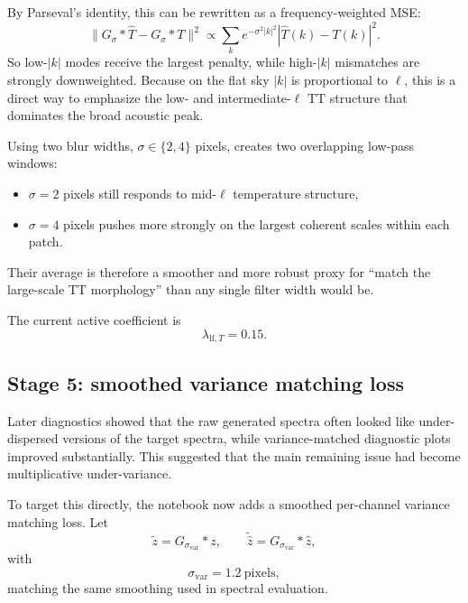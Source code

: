 \documentclass[11pt]{article}
\begin{document}
By Parseval's identity, this can be rewritten as a frequency-weighted MSE:
\begin{equation}
  \|G_\sigma * \hat T - G_\sigma * T\|^2
  \propto
  \sum_k
  e^{-\sigma^2 |k|^2}
  |\hat T(k)-T(k)|^2.
\end{equation}
So low-\(|k|\) modes receive the largest penalty, while high-\(|k|\) mismatches are strongly downweighted. Because on the flat sky \(|k|\) is proportional to \(\ell\), this is a direct way to emphasize the low- and intermediate-\(\ell\) TT structure that dominates the broad acoustic peak.

Using two blur widths, \(\sigma\in\{2,4\}\) pixels, creates two overlapping low-pass windows:
\begin{itemize}[leftmargin=1.5em]
  \item \(\sigma=2\) pixels still responds to mid-\(\ell\) temperature structure,
  \item \(\sigma=4\) pixels pushes more strongly on the largest coherent scales within each patch.
\end{itemize}
Their average is therefore a smoother and more robust proxy for ``match the large-scale TT morphology'' than any single filter width would be.

The current active coefficient is
\begin{equation}
  \lambda_{\mathrm{lf},T} = 0.15.
\end{equation}

\subsection{Stage 5: smoothed variance matching loss}

Later diagnostics showed that the raw generated spectra often looked like under-dispersed versions of the target spectra, while variance-matched diagnostic plots improved substantially. This suggested that the main remaining issue had become multiplicative under-variance.

To target this directly, the notebook now adds a smoothed per-channel variance matching loss. Let
\begin{equation}
  \tilde z = G_{\sigma_{\mathrm{var}}} * z,
  \qquad
  \widetilde{\hat z} = G_{\sigma_{\mathrm{var}}} * \hat z,
\end{equation}
with
\begin{equation}
  \sigma_{\mathrm{var}} = 1.2\ \text{pixels},
\end{equation}
matching the same smoothing used in spectral evaluation.
\end{document}
